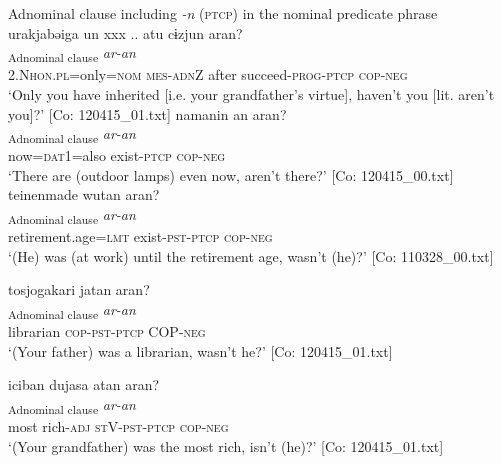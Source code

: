 \ea   
\exi{} Adnominal clause including \textit{-n} (\textsc{ptcp}) in the nominal predicate phrase \label{ex:9.57}
\ea %
 \glll  urakjabəiga  un  xxx ..  atu   cɨzjun  aran?\\
      [\textit{urakja=bəi=ga}  \textit{u-n}    \textit{atu}  \textit{cɨg-tur-n}]\textsubscript{Adnominal clause}  \textit{ar-an}\\
      2.N\textsc{hon}.\textsc{pl}=only=\textsc{nom}  \textsc{mes}-\textsc{adn}Z    after  succeed-\textsc{prog}-\textsc{ptcp}  \textsc{cop}-\textsc{neg}\\
      \glt       ‘Only you have inherited [i.e. your grandfather’s virtue], haven’t you [lit. aren’t you]?’ [Co: 120415\_01.txt]
  \ex{}%
    \glll  namanin  an  aran?\\
      [\textit{nama=n=n}  \textit{ar-n}]\textsubscript{Adnominal clause}  \textit{ar-an}\\
      now=\textsc{dat}1=also  exist-\textsc{ptcp}  \textsc{cop}-\textsc{neg}\\
      \glt       ‘There are (outdoor lamps) even now, aren’t there?’ [Co: 120415\_00.txt]
\ex \label{ex:9.57c} %
    \glll  {\textbar}teinenmade{\textbar}  wutan  aran?\\
      [\textit{teinen=made}  \textit{wur-tar-n}]\textsubscript{Adnominal clause}\textbf{  }\textit{ar-an}\\
      retirement.age=\textsc{lmt}  exist-\textsc{pst}-\textsc{ptcp}  \textsc{cop}-\textsc{neg}\\
      \glt       ‘(He) was (at work) until the retirement age, wasn’t (he)?’ [Co: 110328\_00.txt]

\ex \label{ex:9.57d} %
 \glll  {\textbar}tosjogakari{\textbar}  jatan  aran?\\
      [\textit{tasjogakari}  \textit{jar-tar-n}]\textsubscript{Adnominal clause}  \textit{ar-an}\\
      librarian  \textsc{cop}-\textsc{pst}-\textsc{ptcp}  COP-\textsc{neg}\\
      \glt       ‘(Your father) was a librarian, wasn’t he?’ [Co: 120415\_01.txt]

\ex \label{ex:9.57e} %
 \glll  {\textbar}iciban{\textbar}  dujasa  atan  aran?\\
      [\textit{iciban}  \textit{duja-sa}  \textit{ar-tar-n}]\textsubscript{Adnominal clause}  \textit{ar-an}\\
      most  rich-\textsc{adj}  \textsc{st}V-\textsc{pst}-\textsc{ptcp}  \textsc{cop}-\textsc{neg}\\
      \glt       ‘(Your grandfather) was the most rich, isn’t (he)?’ [Co: 120415\_01.txt]

